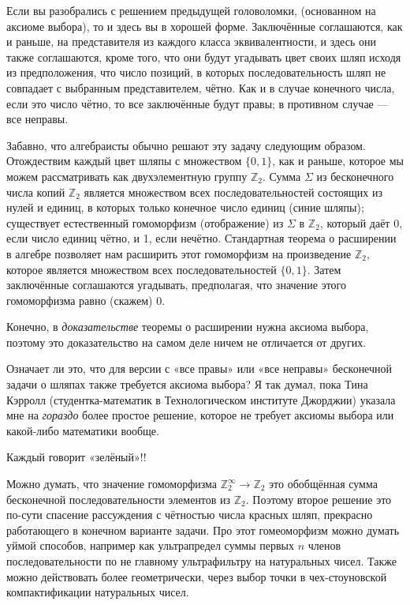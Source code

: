 Если вы разобрались с решением предыдущей головоломки, (основанном на аксиоме выбора), то и здесь вы в хорошей форме.
Заключённые соглашаются, как и раньше, на представителя из каждого класса эквивалентности, и здесь они также соглашаются, кроме того, что они будут угадывать цвет своих шляп исходя из предположения, что число позиций, в которых последовательность шляп не совпадает с выбранным представителем, чётно.
Как и в случае конечного числа, если это число чётно, то все заключённые будут правы; в противном случае --- все неправы.

Забавно, что алгебраисты обычно решают эту задачу следующим образом.
Отождествим каждый цвет шляпы с множеством $\{0, 1\}$, как и раньше, которое мы можем рассматривать как двухэлементную группу $\mathbb{Z}_2$.
Сумма $\Sigma$ из бесконечного числа копий $\mathbb{Z}_2$ является множеством всех последовательностей состоящих из нулей и единиц, в которых только конечное число единиц (синие шляпы); существует естественный гомоморфизм (отображение) из $\Sigma$ в $\mathbb{Z}_2$, который даёт 0, если число единиц чётно, и 1, если нечётно.
Стандартная теорема о расширении в алгебре позволяет нам расширить этот гомоморфизм на произведение $\mathbb{Z}_2$, которое является множеством всех последовательностей $\{0, 1\}$.
Затем заключённые соглашаются угадывать, предполагая, что значение этого гомоморфизма равно (скажем) 0.

Конечно, в \emph{доказательстве} теоремы о расширении нужна аксиома выбора, поэтому это доказательство на самом деле ничем не отличается от других.

Означает ли это, что для версии с «все правы» или «все неправы» бесконечной задачи о шляпах также требуется аксиома выбора?
Я так думал, пока Тина Кэрролл (студентка-математик в Технологическом институте Джорджии) указала мне на \emph{гораздо} более простое решение, которое не требует аксиомы выбора или какой-либо математики вообще.

Каждый говорит «зелёный»!!

\begin{addedbytheeditors}
Можно думать, что значение гомоморфизма $\mathbb{Z}_2^\infty\to \mathbb{Z}_2$ это обобщённая сумма бесконечной последовательности элементов из $\mathbb{Z}_2$.
Поэтому второе решение это по-сути спасение рассуждения с чётностью числа красных шляп, прекрасно работающего в конечном варианте задачи.
Про этот гомеоморфизм можно думать уймой способов, например как ультрапредел суммы первых $n$ членов последовательности по не главному ультрафильтру на натуральных чисел.
Также можно действовать более геометрически, через выбор точки в чех-стоуновской компактификации натуральных чисел. 
\end{addedbytheeditors}


